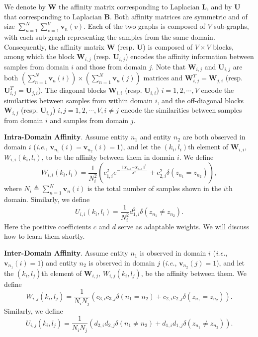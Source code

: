 \documentclass[10pt,twocolumn,letterpaper]{article}
\begin{document}
 We denote by $\mathbf{W}$ the affinity matrix corresponding to Laplacian $\mathbf{L}$, and by $\mathbf{U}$ that corresponding to Laplacian $\mathbf{B}$.  Both affinity matrices are symmetric and of size  $\sum_{n=1}^{N}\sum_{v=1}^{V}\mathbf{v}_{n}(v)$. Each of the two graphs is composed of $V$ sub-graphs, with each sub-gragh representing the samples from the same domain. Consequently, the affinity matrix $\mathbf{W}$ (resp. $\mathbf{U}$) is composed of $V\times V$ blocks, among which the block $\mathbf{W}_{i,j}$ (resp. $\mathbf{U}_{i,j}$) encodes the affinity information between samples from domain $i$ and those from domain $j$. Note that $\mathbf{W}_{i,j}$ and $\mathbf{U}_{i,j}$ are both $(\sum_{n=1}^{N}\mathbf{v}_{n}(i))\times(\sum_{n=1}^{N}\mathbf{v}_{n}(j))$ matrices and $\mathbf{W}_{i,j}^{T}=\mathbf{W}_{j,i}$ (resp. $\mathbf{U}_{i,j}^{T}=\mathbf{U}_{j,i}$). The diagonal blocks $\mathbf{W}_{i,i}$ (resp. $\mathbf{U}_{i,i}$) $i=1,2,\cdots,V$ encode the similarities between samples from within domain $i$, and the off-diagonal blocks $\mathbf{W}_{i,j}$ (resp. $\mathbf{U}_{i,j}$) $i,j=1,2,\cdots,V, i\neq j$ encode the similarities between samples from domain $i$ and samples from domain $j$. 

\vspace{5pt}
\noindent\textbf{Intra-Domain Affinity}. Assume entity $n_{1}$ and entity $n_{2}$ are both observed in domain $i$ (\textit{i.e.}, $\mathbf{v}_{n_{1}}(i)=\mathbf{v}_{n_{2}}(i)=1$), and let the $(k_{i},l_{i})$th element of $\mathbf{W}_{i,i}$, $W_{i,i}(k_{i},l_{i})$, to be the affinity between them in domain $i$. We define
\begin{equation}
\label{Wintra}
W_{i,i}(k_{i},l_{i})=\frac{1}{N_{i}^{2}}(c_{1,i}^{2}e^{-\frac{\|\mathbf{y}_{n_{1},i}-\mathbf{y}_{n_{2},i}\|^{2}}{\sigma^{2}}}+c_{2,i}^{2}\delta(z_{n_{1}}=z_{n_{2}})),
\end{equation}
where $N_i\triangleq \sum_{n=1}^{N}\mathbf{v}_{n}(i)$ is the total number of samples shown in the $i$th domain.
Similarly, we define
\begin{equation}
\label{Uintra}
U_{i,i}(k_{i},l_{i})=\frac{1}{N_{i}^{2}}d_{1,i}^{2}\delta(z_{n_{1}}\neq z_{n_{2}}).
\end{equation}
Here the positive coefficients $c$ and $d$ serve as adaptable weights. We will discuss how to learn them shortly.
 
\vspace{5pt}
\noindent\textbf{Inter-Domain Affinity}. Assume entity $n_{1}$ is observed in domain $i$ (\textit{i.e.}, $\mathbf{v}_{n_{1}}(i)=1$) and entity $n_{2}$ is  observed in domain $j$ (\textit{i.e.}, $\mathbf{v}_{n_{2}}(j)=1$), and let the $(k_{i},l_{j})$th element of $\mathbf{W}_{i,j}$, $W_{i,j}(k_{i},l_{j})$, be the affinity between them. We define
\begin{equation}
\label{Winter}
W_{i,j}(k_{i},l_{j})=\frac{1}{N_{i}N_{j}}(c_{3,i}c_{3,j}\delta(n_{1}=n_{2})+c_{2,i}c_{2,j}\delta(z_{n_{1}}=z_{n_{2}})).
\end{equation}
Similarly, we define
\begin{equation}
\label{Uinter}
U_{i,j}(k_{i},l_{j})=\frac{1}{N_{i}N_{j}}(d_{2,i}d_{2,j}\delta(n_{1}\neq n_{2})+d_{1,i}d_{1,j}\delta(z_{n_{1}}\neq z_{n_{2}})).
\end{equation}
\end{document}
